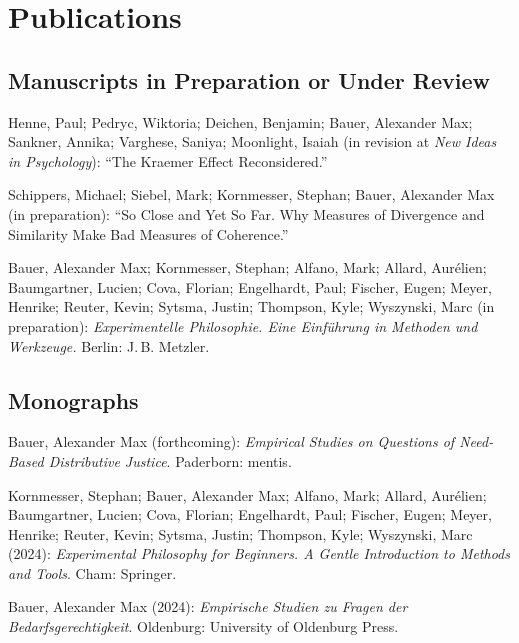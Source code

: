 \documentclass[a4paper,10pt]{article}
\newenvironment{literature}{%
   \parskip6pt\parindent0pt\raggedright
   \def\lititem{\hangindent=1cm\hangafter1}}{%
   \par\ignorespaces}
\begin{document}
\clearpage
\section{Publications}


\subsection*{Manuscripts in Preparation or Under Review}
\begin{literature}
\lititem Henne, Paul; Pedryc, Wiktoria; Deichen, Benjamin; Bauer, Alexander Max; Sankner, Annika; Varghese, Saniya; Moonlight, Isaiah (in revision at \textit{New Ideas in Psychology}): \enquote{The Kraemer Effect Reconsidered.}

\lititem Schippers, Michael; Siebel, Mark; Kornmesser, Stephan; Bauer, Alexander Max (in preparation): \enquote{So Close and Yet So Far. Why Measures of Divergence and Similarity Make Bad Measures of Coherence.}

\lititem Bauer, Alexander Max; Kornmesser, Stephan; Alfano, Mark; Allard, Aurélien; Baumgartner, Lucien; Cova, Florian; Engelhardt, Paul; Fischer, Eugen; Meyer, Henrike; Reuter, Kevin; Sytsma, Justin; Thompson, Kyle; Wyszynski, Marc (in preparation): \textit{Experimentelle Philosophie. Eine Einführung in Methoden und Werkzeuge.} Berlin: J.\,B. Metzler.
\end{literature}


\subsection*{Monographs}
\begin{literature}
\lititem Bauer, Alexander Max (forthcoming): \textit{Empirical Studies on Questions of Need-Based Distributive Justice}. Paderborn: mentis.

\lititem Kornmesser, Stephan; Bauer, Alexander Max; Alfano, Mark; Allard, Aurélien; Baumgartner, Lucien; Cova, Florian; Engelhardt, Paul; Fischer, Eugen; Meyer, Henrike; Reuter, Kevin; Sytsma, Justin; Thompson, Kyle; Wyszynski, Marc (2024): \textit{Experimental Philosophy for Beginners. A Gentle Introduction to Methods and Tools}. Cham: Springer.

\lititem Bauer, Alexander Max (2024): \textit{Empirische Studien zu Fragen der Bedarfsgerechtigkeit}. Oldenburg: University of Oldenburg Press.
\end{literature}
\end{document}
